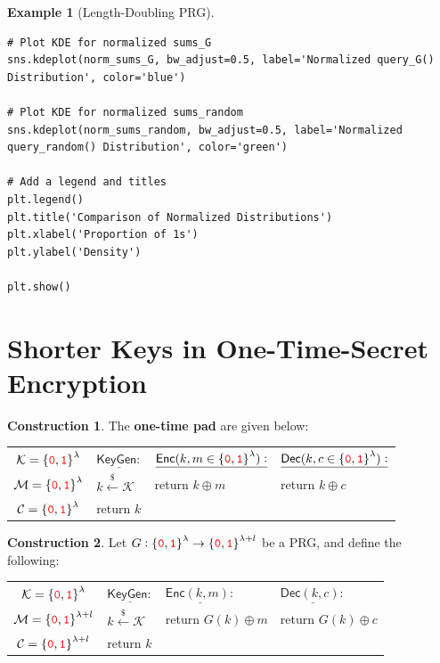 \documentclass[12pt,openany]{book}
\renewcommand{\arraystretch}{1.25}
\theoremstyle{definition}
\newtheorem{construction}{Construction}[chapter]
\newtheorem{example}{Example}[chapter]
\newcommand{\KeyGen}{\mathsf{KeyGen}}
\newcommand{\Enc}{\mathsf{Enc}}
\newcommand{\Dec}{\mathsf{Dec}}
\newcommand{\zero}{\textcolor{red}{\texttt{0}}}
\newcommand{\one}{\textcolor{red}{\texttt{1}}}
\newcommand{\tab}{\hspace{12pt}}
\newcommand{\xor}{\oplus}
\newcommand{\randomness}{\$}
\newcommand{\uniform}{\xleftarrow{\randomness}}
\newcommand{\binaryfield}{\set{\zero,\one}}
\begin{document}
\begin{example}[Length-Doubling PRG]
\begin{lstlisting}[style=sage]
# Plot KDE for normalized sums_G
sns.kdeplot(norm_sums_G, bw_adjust=0.5, label='Normalized query_G() Distribution', color='blue')

# Plot KDE for normalized sums_random
sns.kdeplot(norm_sums_random, bw_adjust=0.5, label='Normalized query_random() Distribution', color='green')

# Add a legend and titles
plt.legend()
plt.title('Comparison of Normalized Distributions')
plt.xlabel('Proportion of 1s')
plt.ylabel('Density')

plt.show()
\end{lstlisting}
\end{example}

\newpage
\section{Shorter Keys in One-Time-Secret Encryption}
\begin{tcolorbox}[colback=white,colframe=purple!50!white,arc=5pt,title={\color{white}\bf One-time Pad (OTP)}]
	\begin{construction}
		The \textbf{one-time pad} are given below: \begin{center}
			{\renewcommand{\arraystretch}{1.5}\begin{tabular}{|c||l|l|l|}
				\hline
				$\mathcal{K}=\binaryfield^\lambda$&$\underline{\KeyGen:}$ & \(\underline{\Enc(k,m\in\binaryfield^\lambda):}\) & \(\underline{\Dec(k,c\in\binaryfield^\lambda):}\)\\
				$\mathcal{M}=\binaryfield^\lambda$&\tab$k\uniform\mathcal{K}$ & \tab return \(k\xor m\) & \tab return \(k\xor c\)\\
				$\mathcal{C}=\binaryfield^\lambda$&\tab return $k$ &&\\
				\hline
			\end{tabular}}
		\end{center}
	\end{construction}
\end{tcolorbox}
\begin{tcolorbox}[colback=white,colframe=purple,arc=5pt,title={\color{white}\bf Pseudo-OTP}]
	\begin{construction}
		Let $G:\binaryfield^\lambda\to\binaryfield^{\lambda+l}$ be a PRG, and define the following: \begin{center}
			{\renewcommand{\arraystretch}{1.5}\begin{tabular}{|c||l|l|l|}
					\hline
					$\mathcal{K}=\binaryfield^\lambda$&$\underline{\KeyGen:}$ & \(\underline{\Enc(k,m):}\) & \(\underline{\Dec(k,c):}\)\\
					$\mathcal{M}=\binaryfield^{\lambda+l}$&\tab$k\uniform\mathcal{K}$ & \tab return \(G(k)\xor m\) & \tab return \(G(k)\xor c\)\\
					$\mathcal{C}=\binaryfield^{\lambda+l}$&\tab return $k$ &&\\
					\hline
			\end{tabular}}
		\end{center}
	\end{construction}
\end{tcolorbox}
\end{document}
